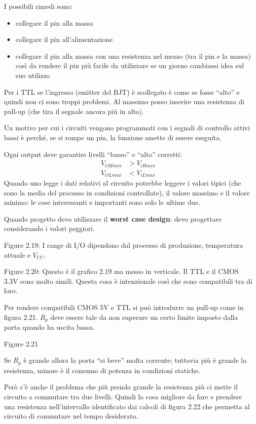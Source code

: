 \documentclass[
]{article}
\providecommand{\tightlist}{%
  \setlength{\itemsep}{0pt}\setlength{\parskip}{0pt}}
\begin{document}
I possibili rimedi sono:

\begin{itemize}
\tightlist
\item
  collegare il pin alla massa
\item
  collegare il pin all'alimentazione
\item
  collegare il pin alla massa con una resistenza nel mezzo (tra il pin e
  la massa) così da rendere il pin più facile da utilizzare se un giorno
  cambiassi idea sul suo utilizzo
\end{itemize}

Per i TTL se l'ingresso (emitter del BJT) è scollegato è come se fosse
``alto'' e quindi non ci sono troppi problemi. Al massimo posso inserire
una resistenza di pull-up (che tira il segnale ancora più in alto).

Un motivo per cui i circuiti vengono programmati con i segnali di
controllo attivi bassi è perché, se si rompe un pin, la funzione smette
di essere eseguita.

Ogni output deve garantire livelli ``basso'' e ``alto'' corretti:
\begin{align*}
V_{OHmin}&>V_{iHmin}\\V_{OLmax}&<V_{iLmax}
\end{align*} Quando uno legge i dati relativi al circuito potrebbe
leggere i valori tipici (che sono la media del processo in condizioni
controllate), il valore massimo e il valore minimo: le cose interessanti
e importanti sono solo le ultime due.

Quando progetto devo utilizzare il \textbf{worst case design}: devo
progettare considerando i valori peggiori.

Figure 2.19: I range di I/O dipendono dal processo di produzione,
temperatura attuale e \(V_{CC}\).

Figure 2.20: Questo è il grafico 2.19 ma messo in verticale. Il TTL e il
CMOS 3.3V sono molto simili. Questa cosa è intenzionale così che sono
compatibili tra di loro.

Per rendere compatibili CMOS 5V e TTL si può introdurre un pull-up come
in figura 2.21. \(R_{p}\) deve essere tale da non superare un certo
limite imposto dalla porta quando ha uscita bassa.

Figure 2.21

Se \(R_{p}\) è grande allora la porta ``si beve'' molta corrente;
tuttavia più è grande la resistenza, minore è il consumo di potenza in
condizioni statiche.

Però c'è anche il problema che più prendo grande la resistenza più ci
mette il circuito a commutare tra due livelli. Quindi la cosa migliore
da fare e prendere una resistenza nell'intervallo identificato dai
calcoli di figura 2.22 che permetta al circuito di commutare nel tempo
desiderato.
\end{document}
